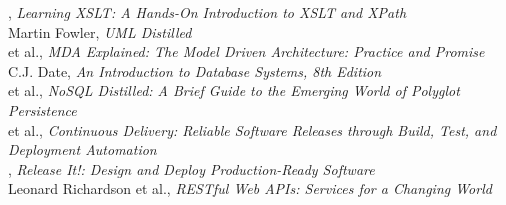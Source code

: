 \documentclass[nobrand,anonymous,nodate,nosecurity]{huawei}
\begin{document}
\begin{multicols}{2}
{}, \emph{Learning XSLT: A Hands-On Introduction to XSLT and XPath}\\
{Martin Fowler}, \emph{UML Distilled}\\
{ et al.}, \emph{MDA Explained: The Model Driven Architecture: Practice and Promise}\\
{C.J. Date}, \emph{An Introduction to Database Systems, 8th Edition}\\
{ et al.}, \emph{NoSQL Distilled: A Brief Guide to the Emerging World of Polyglot Persistence}\\
{ et al.}, \emph{Continuous Delivery: Reliable Software Releases through Build, Test, and Deployment Automation}\\
{}, \emph{Release It!: Design and Deploy Production-Ready Software}\\
{Leonard Richardson et al.}, \emph{RESTful Web APIs: Services for a Changing World}
\end{multicols}
\end{document}
